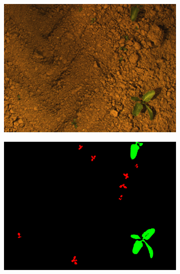 \documentclass[letterpaper, 10 pt, conference]{ieeeconf}  %
\begin{document}
    
    \begin{figure}
	\vspace{1em} 
    \centering
     \begin{subfigure}[b]{0.49\linewidth}
    \includegraphics[width=\linewidth]{pics/unsupervised/img_masks_8mm_fromImages_frame256.png}
   		\caption{}
		\label{unsup_img}    		
    \vspace{1em}
   \end{subfigure}
        \begin{subfigure}[b]{0.49\linewidth}
    \includegraphics[width=\linewidth]{pics/unsupervised/gt_masks_8mm_fromImages_frame256_GroundTruth_iMap.png}
   		\caption{}
		\label{unsup_gt}    		
    \vspace{1em}

\end{subfigure}
\end{figure}
\end{document}
